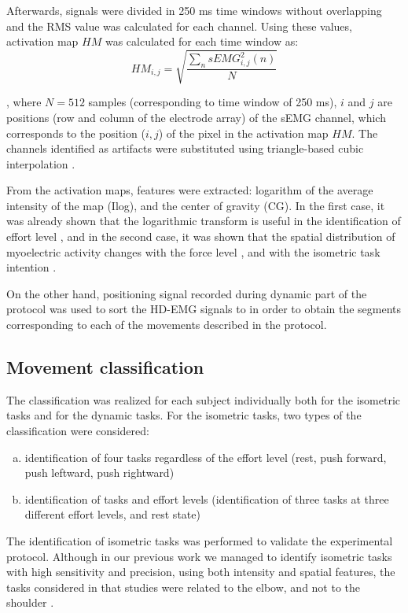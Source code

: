 Afterwards, signals were divided in 250 ms time windows without overlapping and the RMS value was calculated for each channel. Using these values, activation map $HM$ was calculated for each time window as:
\begin{equation} \label{eq:4-1}
HM_{i,j} = \sqrt{\frac{\sum_n{sEMG_{i,j}^2 (n)}}{N}}
\end{equation}

, where $N=512$ samples (corresponding to time window of 250 ms), $i$ and $j$ are positions (row and column of the electrode array) of the sEMG channel, which corresponds to the position ($i,j$) of the pixel in the activation map $HM$. The channels identified as artifacts were substituted using triangle-based cubic interpolation \citep{Rojas-Martinez2012}.

From the activation maps, features were extracted: logarithm of the average intensity of the map (Ilog), and the center of gravity (CG). In the first case, it was already shown that the logarithmic transform is useful in the identification of effort level \citep{Rojas-Martinez2012}, and in the second case, it was shown that the spatial distribution of myoelectric activity changes with the force level \citep{Holtermann2005}, and with the isometric task intention \citep{Jordanic2016a}.

On the other hand, positioning signal recorded during dynamic part of the protocol was used to sort the HD-EMG signals to in order to obtain the segments corresponding to each of the movements described in the protocol.


\subsection{Movement classification}
The classification was realized for each subject individually both for the isometric tasks and for the dynamic tasks. For the isometric tasks, two types of the classification were considered:

\begin{enumerate}[a)]
\item identification of four tasks regardless of the effort level (rest, push forward, push leftward, push rightward)

\item identification of tasks and effort levels (identification of three tasks at three different effort levels, and rest state)
\end{enumerate}

The identification of isometric tasks was performed to validate the experimental protocol. Although in our previous work we managed to identify isometric tasks with high sensitivity and precision, using both intensity and spatial features, the tasks considered in that studies were related to the elbow, and not to the shoulder \citep{Jordanic2016a, Jordanic2016b, Rojas-Martinez2013}.

